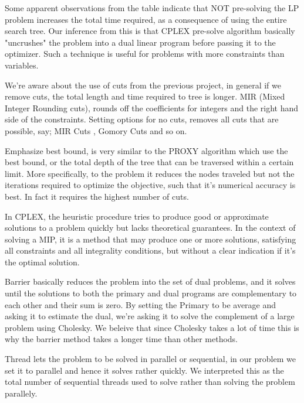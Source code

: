 \documentclass{article}
\begin{document}
Some apparent observations from the table indicate that NOT pre-solving the LP problem increases the total time required, as a consequence of using the entire search tree. Our inference from this is that CPLEX pre-solve algorithm basically "uncrushes" the problem into a dual linear program before passing it to the optimizer. Such a technique is useful for problems with more constraints than variables.

We're aware about the use of cuts from the previous project, in general if we remove cuts, the total length and time required to tree is longer. MIR (Mixed Integer Rounding cuts), rounds off the coefficients for integers and the right hand side of the constraints. Setting options for no cuts, removes all cuts that are possible, say; MIR Cuts , Gomory Cuts and so on.

Emphasize best bound, is very similar to the PROXY algorithm which use the best bound, or the total depth of the tree that can be traversed within a certain limit. More specifically, to the problem it reduces the nodes traveled but not the iterations required to optimize the objective, such that it's numerical accuracy is best. In fact it requires the highest number of cuts.

In CPLEX, the heuristic procedure tries to produce good or approximate solutions to a problem quickly but lacks theoretical guarantees. In the context of solving a MIP, it is a method that may produce one or more solutions, satisfying all constraints and all integrality conditions, but without a clear indication if it's the optimal solution.

Barrier basically reduces the problem into the set of dual problems, and it solves until the solutions to both the primary and dual programs are complementary to each other and their sum is zero. By setting the Primary to be average and asking it to estimate the dual, we're asking it to solve the complement of a large problem using Cholesky. We beleive that since Cholesky takes a lot of time this is why the barrier method takes a longer time than other methods. 

Thread lets the problem to be solved in parallel or sequential, in our problem we set it to parallel and hence it solves rather quickly. We interpreted this as the total number of sequential threads used to solve rather than solving the problem parallely.
\end{document}
